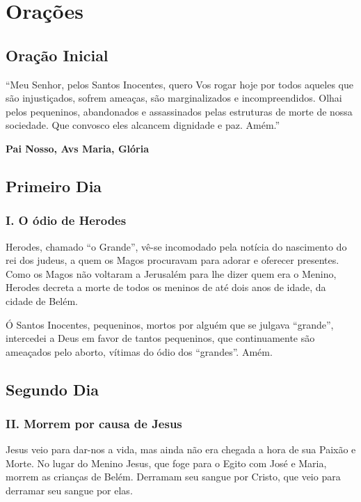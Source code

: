 \documentclass[11pt]{article}
\begin{document}

\section{Orações}\label{sec:Orações} %

\subsection{Oração Inicial} %

“Meu Senhor, pelos Santos Inocentes, quero Vos rogar hoje por todos aqueles que são injustiçados, sofrem ameaças, são marginalizados e incompreendidos. Olhai pelos pequeninos, abandonados e assassinados pelas estruturas de morte de nossa sociedade. Que convosco eles alcancem dignidade e paz. Amém.”

\textbf{Pai Nosso, Avs Maria, Glória}

\subsection{Primeiro Dia}
\subsubsection*{I. O ódio de Herodes}

Herodes, chamado “o Grande”, vê-se incomodado pela notícia do nascimento do rei dos judeus, a quem os Magos procuravam para adorar e oferecer presentes. Como os Magos não voltaram a Jerusalém para lhe dizer quem era o Menino, Herodes decreta a morte de todos os meninos de até dois anos de idade, da cidade de Belém.

Ó Santos Inocentes, pequeninos, mortos por alguém que se julgava “grande”, intercedei a Deus em favor de tantos pequeninos, que continuamente são ameaçados pelo aborto, vítimas do ódio dos “grandes”. Amém.

\subsection{Segundo Dia}
\subsubsection*{II. Morrem por causa de Jesus}

Jesus veio para dar-nos a vida, mas ainda não era chegada a hora de sua Paixão e Morte. No lugar do Menino Jesus, que foge para o Egito com José e Maria, morrem as crianças de Belém. Derramam seu sangue por Cristo, que veio para derramar seu sangue por elas.
\end{document}

